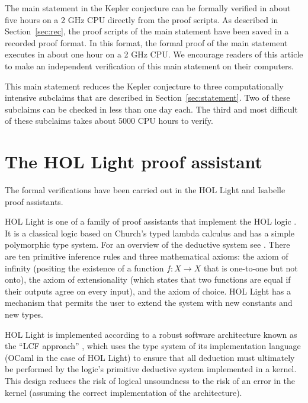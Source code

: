 
The main statement in the Kepler conjecture can be formally verified
in about five hours on a 2 GHz CPU directly from the proof scripts.
As described in Section~\ref{sec:rec}, the proof scripts of the main
statement have been saved in a recorded proof format.  In this format,
the formal proof of the main statement executes in about one hour on a
2 GHz CPU.  We encourage readers of this article to make an
independent verification of this main statement on their computers.

This main statement reduces the Kepler conjecture to three
computationally intensive subclaims that are described in
Section~\ref{sec:statement}.  Two of these subclaims can be checked in
less than one day each.  The third and most difficult of these
subclaims takes about 5000 CPU hours to verify.



\section{The HOL Light proof assistant}\label{sec:hl}

The formal verifications have been carried out in the HOL Light and
Isabelle proof assistants.

HOL Light is one of a family of proof assistants that implement the
HOL logic \cite{gordon1993introduction}.  It is a classical logic
based on Church's typed lambda calculus and has a simple polymorphic
type system.  For an overview of the deductive system see
\cite{harrison2009hol}.  There are ten primitive inference rules and
three mathematical axioms: the axiom of infinity (positing the
existence of a function $f:X\to X$ that is one-to-one but not onto),
the axiom of extensionality (which states that two functions are equal
if their outputs agree on every input), and the axiom of choice.  HOL
Light has a mechanism that permits the user to extend the system with
new constants and new types.

HOL Light is implemented according to a robust software architecture
known as the ``LCF approach'' \cite{gordon1979edinburgh}, which uses
the type system of its implementation language (OCaml in the case of
HOL Light) to ensure that all deduction must ultimately be
performed by the logic's primitive deductive system implemented in a
kernel.  This design reduces the risk of logical unsoundness to the
risk of an error in the kernel (assuming the correct implementation of
the architecture).

